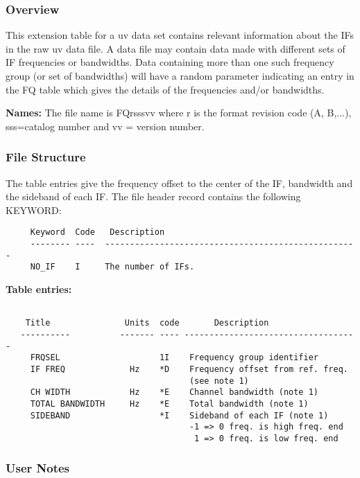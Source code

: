 \subsubsection{Overview}

   This extension table for a uv data set contains relevant
information about the IFs in the raw uv data file.  A data file may
contain data made with different sets of IF frequencies or bandwidths.
Data containing more than one such frequency group (or set of
bandwidths) will have a random parameter indicating an entry in the FQ
table which gives the details of the frequencies and/or bandwidths.


{\bf Names:} The file name is FQrsssvv where r is the format revision
code (A, B,...), sss=catalog number and vv = version number.

\subsubsection{File Structure}

     The table entries give the frequency offset to the center of the
IF, bandwidth and the sideband of each IF.  The file header record
contains the following KEYWORD:

\begin{verbatim}
     Keyword  Code   Description
     -------- ----  ---------------------------------------------------
     NO_IF    I     The number of IFs.

\end{verbatim}
{\bf Table entries:}
\begin{verbatim}

    Title               Units  code       Description
   ----------          ------- ---- -----------------------------------
     FRQSEL                    1I    Frequency group identifier
     IF FREQ             Hz    *D    Frequency offset from ref. freq.
                                     (see note 1)
     CH WIDTH            Hz    *E    Channel bandwidth (note 1)
     TOTAL BANDWIDTH     Hz    *E    Total bandwidth (note 1)
     SIDEBAND                  *I    Sideband of each IF (note 1)
                                     -1 => 0 freq. is high freq. end
                                      1 => 0 freq. is low freq. end

\end{verbatim}
\subsubsection{User Notes}

